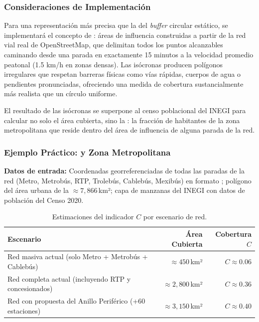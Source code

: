 \subsubsection{Consideraciones de Implementación}
 
Para una representación más precisa que la del \textit{buffer} circular
estático, se
implementará el concepto de : áreas de influencia construidas
a
partir de la red vial real de OpenStreetMap, que delimitan todos los puntos
alcanzables caminando desde una parada en exactamente 15 minutos a la velocidad
promedio peatonal (1.5 km/h en zonas densas). Las isócronas producen polígonos
irregulares que respetan barreras físicas como vías rápidas, cuerpos de agua o
pendientes pronunciadas, ofreciendo una medida de cobertura sustancialmente más
realista que un círculo uniforme.
 
El resultado de las isócronas se superpone al censo poblacional del INEGI para
calcular no solo el área cubierta, sino la : la
fracción de
habitantes de la zona metropolitana que reside dentro del área de influencia de
alguna parada de la red.
 
\subsubsection{Ejemplo Práctico: \cdmx{} y Zona Metropolitana}
 
\textbf{Datos de entrada:} Coordenadas georreferenciadas de todas las paradas de
la red (Metro, Metrobús, RTP, Trolebús, Cablebús, Mexibús) en formato \geojson{}
;
polígono del área urbana de la \zmvm{} $\approx 7{,}866$\,km²; capa de manzanas
del INEGI con datos de población del Censo 2020.


\begin{table}[H]
    \centering
    \caption{Estimaciones del indicador $C$ por escenario de red.}
    \label{tab:cobertura-escenarios}
    \begin{tabularx}{\textwidth}{X r r}
        \toprule
        \textbf{Escenario} & \textbf{Área Cubierta} & \textbf{Cobertura $C$} \\
        \midrule
        Red masiva actual (solo Metro + Metrobús + Cablebús)
            & $\approx 450$\,km² & $C \approx 0.06$ \\
        Red completa actual (incluyendo RTP y concesionados)
            & $\approx 2{,}800$\,km² & $C \approx 0.36$ \\
        Red con propuesta del Anillo Periférico (+60 estaciones)
            & $\approx 3{,}150$\,km² & $C \approx 0.40$ \\
        \bottomrule
    \end{tabularx}
\end{table}
 
